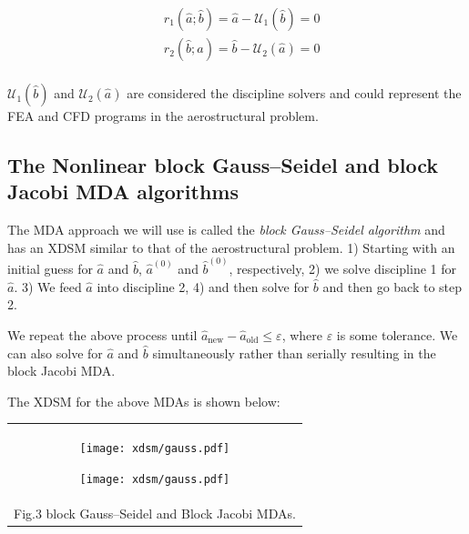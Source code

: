 \documentclass[11pt]{article}
\begin{document}
\begin{align*}
    & r_1(\hat{a};\hat{b}) = \hat{a} - \mathcal{U}_1(\hat{b}) = 0\\
    & r_2(\hat{b};\hat{a}) = \hat{b} - \mathcal{U}_2(\hat{a}) = 0\\
\end{align*}

\(\mathcal{U}_1(\hat{b})\) and \(\mathcal{U}_2(\hat{a})\) are considered
the discipline solvers and could represent the FEA and CFD programs in
the aerostructural problem.

    \hypertarget{the-nonlinear-block-gaussseidel-and-block-jacobi-mda-algorithms}{%
\subsection{The Nonlinear block Gauss--Seidel and block Jacobi MDA
algorithms}\label{the-nonlinear-block-gaussseidel-and-block-jacobi-mda-algorithms}}

The MDA approach we will use is called the \emph{block Gauss--Seidel
algorithm} and has an XDSM similar to that of the aerostructural
problem. 1) Starting with an initial guess for \(\hat{a}\) and
\(\hat{b}\), \(\hat{a}^{(0)}\) and \(\hat{b}^{(0)}\), respectively, 2)
we solve discipline 1 for \(\hat{a}\). 3) We feed \(\hat{a}\) into
discipline 2, 4) and then solve for \(\hat{b}\) and then go back to step
2.

We repeat the above process until
\(\hat{a}_\mathrm{new} - \hat{a}_\mathrm{old} \leq \varepsilon\), where
\(\varepsilon\) is some tolerance. We can also solve for \(\hat{a}\) and
\(\hat{b}\) simultaneously rather than serially resulting in the block
Jacobi MDA.

The XDSM for the above MDAs is shown below:

\begin{longtable}[]{@{}c@{}}
\toprule
\endhead
\begin{minipage}[t]{0.97\columnwidth}\centering
    \begin{figure}
        \centering
        \texttt{[image: xdsm/gauss.pdf]}
    \end{figure}
    \begin{figure}
        \centering
        \texttt{[image: xdsm/gauss.pdf]}
    \end{figure}
\end{minipage}\tabularnewline
Fig.3 block Gauss--Seidel and Block Jacobi MDAs.\tabularnewline
\bottomrule
\end{longtable}
\end{document}
